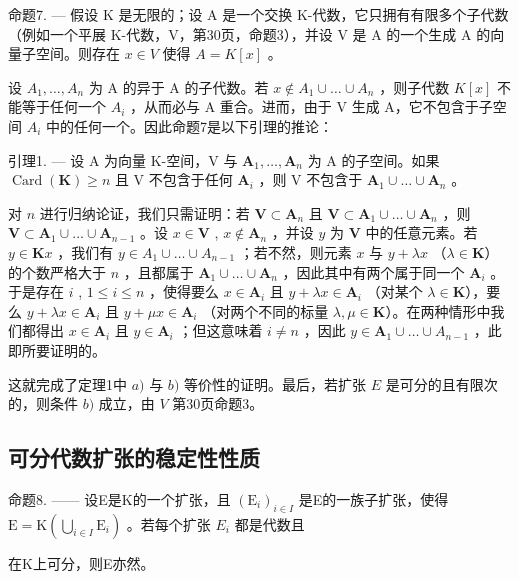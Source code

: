 命题7. --- 假设 K 是无限的；设 A 是一个交换 K-代数，它只拥有有限多个子代数（例如一个平展 K-代数，V，第30页，命题3），并设 V 是 A 的一个生成 A 的向量子空间。则存在 \(x \in V\) 使得 \(A = K[x]\) 。

设 \(A_{1}, \ldots, A_{n}\) 为 A 的异于 A 的子代数。若 \(x \notin A_{1} \cup \ldots \cup A_{n}\) ，则子代数 \(K[x]\) 不能等于任何一个 \(A_{i}\) ，从而必与 A 重合。进而，由于 V 生成 A，它不包含于子空间 \(A_{i}\) 中的任何一个。因此命题7是以下引理的推论：

引理1. --- 设 A 为向量 K-空间，V 与 \(\mathbf{A}_1, \ldots, \mathbf{A}_n\) 为 A 的子空间。如果 \(\operatorname{Card}(\mathbf{K}) \geqslant n\) 且 V 不包含于任何 \(\mathbf{A}_i\) ，则 V 不包含于 \(\mathbf{A}_1 \cup \ldots \cup \mathbf{A}_n\) 。

对 \(n\) 进行归纳论证，我们只需证明：若 \(\mathbf{V} \subset \mathbf{A}_n\) 且 \(\mathbf{V} \subset \mathbf{A}_1 \cup \ldots \cup \mathbf{A}_n\) ，则 \(\mathbf{V} \subset \mathbf{A}_1 \cup \ldots \cup \mathbf{A}_{n-1}\) 。设 \(x \in \mathbf{V}\) , \(x \notin \mathbf{A}_n\) ，并设 \(y\) 为 \(\mathbf{V}\) 中的任意元素。若 \(y \in \mathbf{K}x\) ，我们有 \(y \in A_1 \cup \ldots \cup A_{n-1}\) ；若不然，则元素 \(x\) 与 \(y + \lambda x\) （\(\lambda \in \mathbf{K}\)）的个数严格大于 \(n\) ，且都属于 \(\mathbf{A}_1 \cup \ldots \cup \mathbf{A}_n\) ，因此其中有两个属于同一个 \(\mathbf{A}_i\) 。于是存在 \(i\) , \(1 \leqslant i \leqslant n\) ，使得要么 \(x \in \mathbf{A}_i\) 且 \(y + \lambda x \in \mathbf{A}_i\) （对某个 \(\lambda \in \mathbf{K}\)），要么 \(y + \lambda x \in \mathbf{A}_i\) 且 \(y + \mu x \in \mathbf{A}_i\) （对两个不同的标量 \(\lambda, \mu \in \mathbf{K}\)）。在两种情形中我们都得出 \(x \in \mathbf{A}_i\) 且 \(y \in \mathbf{A}_i\) ；但这意味着 \(i \neq n\) ，因此 \(y \in \mathbf{A}_1 \cup \ldots \cup A_{n-1}\) ，此即所要证明的。

这就完成了定理1中 \(a)\) 与 \(b)\) 等价性的证明。最后，若扩张 \(E\) 是可分的且有限次的，则条件 \(b)\) 成立，由 \(V\) 第30页命题3。

\subsection{可分代数扩张的稳定性性质}

命题8. —— 设E是K的一个扩张，且 \((\mathrm{E}_{i})_{i\in I}\) 是E的一族子扩张，使得 \(\mathrm{E}=\mathrm{K}\left(\bigcup_{i\in I}\mathrm{E}_{i}\right)\) 。若每个扩张 \(E_{i}\) 都是代数且

在K上可分，则E亦然。

